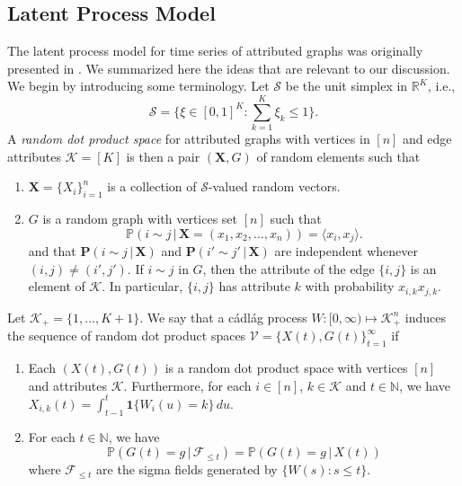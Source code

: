 \documentclass[draftcls]{IEEEtran}
\begin{document}
\subsection{Latent Process Model}
The latent process model for time series of attributed graphs was
originally presented in
\cite{lee:_laten_proces_model_time_attrib_random_graph}. We summarized
here the ideas that are relevant to our discussion. We begin by
introducing some terminology. Let $\mathscr{S}$ be the unit simplex in
$\mathbb{R}^{K}$, i.e.,
\begin{equation}
  \mathscr{S} = \{ \xi \in [0,1]^{K}
  \colon \sum_{k = 1}^{K} \xi_k \leq 1 \}.
\end{equation}
A {\em random dot product space} for attributed graphs with vertices
in $[n]$ and edge attributes $\mathscr{K} = [K]
$ is then a pair $(\mathbf{X},G)$ of random elements such that
\begin{enumerate}
\item $\mathbf{X} = \{X_i\}_{i = 1}^{n}$ is a collection of
  $\mathscr{S}$-valued random vectors.
\item $G$ is a random graph with vertices set $[n]$ such that
  \begin{equation}
    \label{eq:1}
    \mathbb{P}(i \sim j \,|\, \mathbf{X} = (x_1, x_2, \dots,
    x_n)) = \langle x_i, x_j \rangle.
  \end{equation}
  and that $\mathbf{P}(i \sim j \,|\, \mathbf{X})$ and $\mathbf{P}(i' \sim
  j' \,|\, \mathbf{X})$ are independent whenever $(i,j) \not = (i',j')$. If
  $i \sim j$ in $G$, then the attribute of the edge $\{i,j\}$ is an
  element of $\mathscr{K}$. In particular, $\{i,j\}$ has attribute $k$
  with probability $x_{i,k} x_{j,k}$. 
\end{enumerate}
Let $\mathscr{K}_{+} = \{1,\dots,K+1\}$. We say that a c\'{a}dl\'{a}g
process $W \colon [0,\infty) \mapsto \mathscr{K}_{+}^{n}$ induces the
sequence of random dot product spaces $\mathscr{V} = \{X(t), G(t)\}_{t
  = 1}^{\infty}$ if
\begin{enumerate}
\item Each $(X(t), G(t))$ is a random dot product space with vertices
  $[n]$ and attributes $\mathscr{K}$. Furthermore, for each
  $i \in [n]$, $k \in \mathscr{K}$ and $t \in \mathbb{N}$, we have
  $X_{i,k}(t)  = \int_{t - 1}^{t}{ \mathbf{1}\{W_i(u) = k\}\, du}$.
\item  For each $t \in \mathbb{N}$, we have
  \begin{equation}
    \label{eq:2}
    \mathbb{P}(G(t) = g \,|\, \mathscr{F}_{\leq t}) = \mathbb{P}(G(t) = g \,|\, X(t))
  \end{equation}
where $\mathscr{F}_{\leq t}$ are the sigma fields generated by $\{W(s)
  \colon s \leq t\}$.
\end{enumerate}
\end{document}
